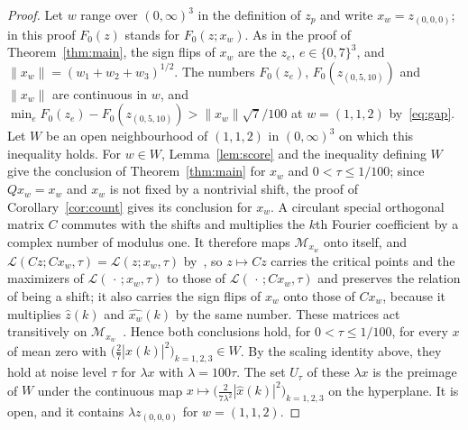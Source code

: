 \documentclass[11pt]{article}
\theoremstyle{remark}
\begin{document}
\begin{proof}
Let $w$ range over $(0,\infty)^3$ in the definition of $z_p$ and write $x_w=z_{(0,0,0)}$; in this proof $F_0(z)$ stands for $F_0(z;x_w)$. As in the proof of Theorem~\ref{thm:main}, the sign flips of $x_w$ are the $z_e$, $e\in\{0,7\}^3$, and $\|x_w\|=(w_1+w_2+w_3)^{1/2}$. The numbers $F_0(z_e)$, $F_0(z_{(0,5,10)})$ and $\|x_w\|$ are continuous in $w$, and $\min_eF_0(z_e)-F_0(z_{(0,5,10)})>\|x_w\|\sqrt7/100$ at $w=(1,1,2)$ by~\eqref{eq:gap}. Let $W$ be an open neighbourhood of $(1,1,2)$ in $(0,\infty)^3$ on which this inequality holds. For $w\in W$, Lemma~\ref{lem:score} and the inequality defining $W$ give the conclusion of Theorem~\ref{thm:main} for $x_w$ and $0<\tau\le1/100$; since $Qx_w=x_w$ and $x_w$ is not fixed by a nontrivial shift, the proof of Corollary~\ref{cor:count} gives its conclusion for $x_w$. A circulant special orthogonal matrix $C$ commutes with the shifts and multiplies the $k$th Fourier coefficient by a complex number of modulus one. It therefore maps $\mathcal M_{x_w}$ onto itself, and $\mathcal L(Cz;Cx_w,\tau)=\mathcal L(z;x_w,\tau)$ by~\cite[Lemma~3.1]{SSA24}, so $z\mapsto Cz$ carries the critical points and the maximizers of $\mathcal L(\,\cdot\,;x_w,\tau)$ to those of $\mathcal L(\,\cdot\,;Cx_w,\tau)$ and preserves the relation of being a shift; it also carries the sign flips of $x_w$ onto those of $Cx_w$, because it multiplies $\widehat z(k)$ and $\widehat{x_w}(k)$ by the same number. These matrices act transitively on $\mathcal M_{x_w}$~\cite[Remark~2.3]{SSA24}. Hence both conclusions hold, for $0<\tau\le1/100$, for every $x$ of mean zero with $\bigl(\tfrac27|\widehat x(k)|^2\bigr)_{k=1,2,3}\in W$. By the scaling identity above, they hold at noise level $\tau$ for $\lambda x$ with $\lambda=100\tau$. The set $U_\tau$ of these $\lambda x$ is the preimage of $W$ under the continuous map $x\mapsto\bigl(\tfrac{2}{7\lambda^2}|\widehat x(k)|^2\bigr)_{k=1,2,3}$ on the hyperplane. It is open, and it contains $\lambda z_{(0,0,0)}$ for $w=(1,1,2)$.
\end{proof}
\end{document}
